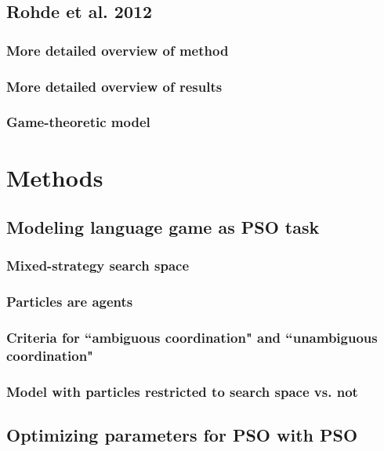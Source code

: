 \documentclass[12pt]{article}
\begin{document}
\subsection{Rohde et al. 2012}
\subsubsection{More detailed overview of method}
\subsubsection{More detailed overview of results}
\subsubsection{Game-theoretic model}


\section{Methods}
\subsection{Modeling language game as PSO task}
\subsubsection{Mixed-strategy search space}
\subsubsection{Particles are agents}
\subsubsection{Criteria for ``ambiguous coordination" and ``unambiguous coordination"}
\subsubsection{Model with particles restricted to search space vs. not}

\subsection{Optimizing parameters for PSO with PSO}
\end{document}

